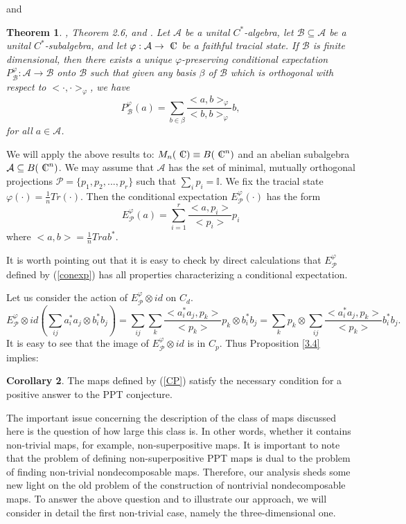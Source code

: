 \documentclass{amsart}
\theoremstyle{plain}
\newtheorem{thm}{Theorem}[section]
\theoremstyle{definition}
\newtheorem{cor}[thm]{Corollary}
\newcommand{\cA}{\mathcal{A}}
\newcommand{\cB}{\mathcal{B}}
\newcommand{\cP}{\mathcal{P}}
\newcommand{\Cn}{{\setbox0=\hbox{
$\displaystyle\rm C$}\hbox{\hbox
to0pt{\kern0.6\wd0\vrule height0.9\ht0\hss}\box0}}} %
\newcommand{\jed}{{\mathbb{I}}}
\begin{document}
and
\begin{thm}
\cite{AGK}, Theorem 2.6, and \cite{AL}.
Let $\cA$ be a unital $C^*$-algebra, let $\cB \subseteq \cA$ be a unital $C^*$-subalgebra, and let $\varphi : \cA \to \Cn$ be a faithful tracial state. If $\cB$ is finite dimensional, then there exists a unique $\varphi$-preserving conditional expectation $P^{\varphi}_{\cB} : \cA \to \cB$ onto $\cB$ such that given any basis $\beta$ of $\cB$ which is orthogonal with respect to $<\cdot, \cdot>_{\varphi}$, we have
\begin{equation}
P^{\varphi}_{\cB}(a) = \sum_{b \in \beta} \frac{<a,b>_{\varphi}}{<b,b>_{\varphi}} b,
\end{equation}
for all $a \in \cA$.
\end{thm}
We will apply the above results to: $M_n(\Cn) \equiv B({\Cn}^n)$ and an abelian subalgebra $\cA \subseteq B({\Cn}^n)$. We may assume that $\cA$ has the set of minimal, mutually orthogonal projections $\cP = \{p_1,p_2,...,p_r\}$ such that $\sum_i p_i = \jed$.
We fix the tracial state $\varphi(\cdot) = \frac{1}{n} Tr(\cdot)$. Then the conditional expectation $E^{\varphi}_{\cP} (\cdot)$ has the form
\begin{equation}
\label{conexp}
E^{\varphi}_{\cP} (a) = \sum_{i=1}^r \frac{<a,p_i>}{<p_i>} p_i
\end{equation}
where $<a,b> = \frac{1}{n} Tr ab^*$.

It is worth pointing out that it is easy to check by direct calculations that $E^{\varphi}_{\cP}$ defined by (\ref{conexp})  has all properties characterizing a conditional expectation.

Let us consider the action of $E^{\varphi}_{\cP}\otimes id$ on $C_d$.
\begin{equation}
E^{\varphi}_{\cP}\otimes id(\sum_{ij} a^*_ia_j \otimes b^*_ib_j) = \sum_{ij} \sum_k \frac{<a^*_ia_j,p_k>}{<p_k>} p_k\otimes b^*_ib_j
=\sum_k p_k \otimes \sum_{ij} \frac{<a^*_ia_j,p_k>}{<p_k>} b^*_ib_j.
\end{equation}
It is easy to see that the image of $E^{\varphi}_{\cP}\otimes id$ is in $C_p$. Thus Proposition \ref{3.4} implies:
\begin{cor}
The maps defined by (\ref{CP}) satisfy the necessary condition
 for a positive answer to the PPT conjecture.
\end{cor}

The important issue concerning the description of the class of maps discussed here is the question of how large this class is. In other words, whether it contains non-trivial maps, for example, non-superpositive maps. It is important to note that the problem of defining non-superpositive PPT maps is dual to the problem of finding non-trivial nondecomposable maps. Therefore, our analysis sheds some new light on the old problem of the construction of nontrivial nondecomposable maps. 
To answer the above question and to illustrate our approach, we will consider in detail the first non-trivial case, namely the three-dimensional one.
\end{document}
